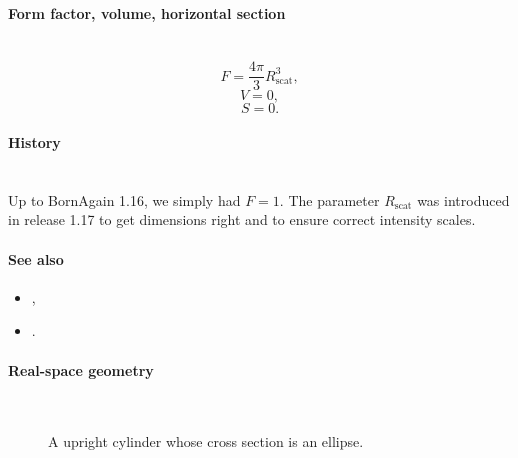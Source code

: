 \paragraph{Form factor, volume, horizontal section}\strut\\
\begin{equation*}
  F = \frac{4\pi}{3} R_\text{scat}^3,
\end{equation*}
\begin{equation*}
  V = 0,
\end{equation*}
\begin{equation*}
  S= 0.
\end{equation*}

\paragraph{History}\strut\\

Up to BornAgain 1.16, we simply had $F=1$.
The parameter $R_\text{scat}$ was introduced in release 1.17 to get
dimensions right and to ensure correct intensity scales.

\paragraph{See also}
\begin{itemize}
\item {},
\item {}.
\end{itemize}


 \label{SEllipsoidalCylinder}

\paragraph{Real-space geometry}\strut\\

\begin{figure}[H]
\hfill
{}
\hfill
{}
\hfill
{}
\hfill
\caption{A upright cylinder whose cross section is an ellipse.}
\end{figure}

